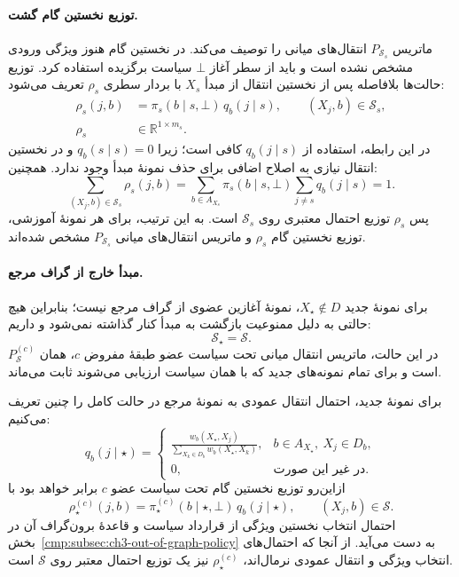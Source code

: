 \paragraph{توزیع نخستین گام گشت.}
ماتریس $P_{\mathcal S_s}$ انتقال‌های میانی
را توصیف می‌کند. در نخستین گام هنوز
ویژگی ورودی مشخص نشده است و باید از
سطر آغاز $\bot$ سیاست برگزیده استفاده کرد.
توزیع حالت‌ها بلافاصله پس از نخستین
انتقال از مبدأ $X_s$ با بردار سطری
$\rho_s$ تعریف می‌شود:
\begin{equation}\label{cmp:eq:ch3-block-first-step}
\boxed{
\begin{aligned}
\rho_s(j,b)&=\pi_s(b\mid s,\bot)\,q_b(j\mid s),
\qquad (X_j,b)\in\mathcal S_s,\\
\rho_s&\in\mathbb R^{1\times m_s}.
\end{aligned}
}
\end{equation}
در این رابطه، استفاده از $q_b(j\mid s)$
کافی است؛ زیرا $q_b(s\mid s)=0$ و
در نخستین انتقال نیازی به اصلاح اضافی
برای حذف نمونهٔ مبدأ وجود ندارد.
همچنین:
\[
\sum_{(X_j,b)\in\mathcal S_s}\rho_s(j,b)
=\sum_{b\in A_{X_s}}\pi_s(b\mid s,\bot)
\sum_{j\ne s}q_b(j\mid s)=1.
\]
پس $\rho_s$ توزیع احتمال معتبری روی
$\mathcal S_s$ است. به این ترتیب، برای
هر نمونهٔ آموزشی، توزیع نخستین گام
$\rho_s$ و ماتریس انتقال‌های میانی
$P_{\mathcal S_s}$ مشخص شده‌اند.

\paragraph{مبدأ خارج از گراف مرجع.}
برای نمونهٔ جدید $X_\star\notin D$،
نمونهٔ آغازین عضوی از گراف مرجع نیست؛
بنابراین هیچ حالتی به دلیل ممنوعیت
بازگشت به مبدأ کنار گذاشته نمی‌شود و داریم:
\begin{equation}\label{cmp:eq:ch3-out-of-graph-state-space}
\boxed{\mathcal S_\star=\mathcal S.}
\end{equation}
در این حالت، ماتریس انتقال میانی تحت
سیاست عضو طبقهٔ مفروض $c$، همان
$P_{\mathcal S}^{(c)}$ است و برای
تمام نمونه‌های جدید که با همان سیاست
ارزیابی می‌شوند ثابت می‌ماند.

برای نمونهٔ جدید، احتمال انتقال عمودی
به نمونهٔ مرجع در حالت کامل را چنین تعریف می‌کنیم:
\begin{equation}\label{cmp:eq:ch3-query-base-vertical}
q_b(j\mid\star)=
\begin{cases}
\displaystyle
\frac{w_b(X_\star,X_j)}
{\sum\limits_{X_k\in D_b}w_b(X_\star,X_k)},
&b\in A_{X_\star},\ X_j\in D_b,\\[6pt]
0,&\text{در غیر این صورت}.
\end{cases}
\end{equation}
ازاین‌رو توزیع نخستین گام تحت سیاست
عضو $c$ برابر خواهد بود با
\begin{equation}\label{cmp:eq:ch3-query-first-state}
\boxed{
\rho_\star^{(c)}(j,b)
=\pi_\star^{(c)}(b\mid\star,\bot)\,
q_b(j\mid\star),
\qquad (X_j,b)\in\mathcal S.
}
\end{equation}
احتمال انتخاب نخستین ویژگی از قرارداد
سیاست و قاعدهٔ برون‌گراف آن در
بخش~\ref{cmp:subsec:ch3-out-of-graph-policy}
به دست می‌آید. از آنجا که احتمال‌های
انتخاب ویژگی و انتقال عمودی نرمال‌اند،
$\rho_\star^{(c)}$ نیز یک توزیع احتمال
معتبر روی $\mathcal S$ است.

